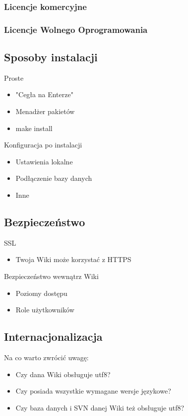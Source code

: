 \documentclass{article}
\begin{document}
	\subsubsection{Licencje komercyjne}
	\subsubsection{Licencje Wolnego Oprogramowania}
	\subsection{Sposoby instalacji}
		Proste
		\begin{itemize}
			\item "Cegła na Enterze"
			\item Menadżer pakietów
			\item make install
		\end{itemize}
		Konfiguracja po instalacji
		\begin{itemize}
			\item Ustawienia lokalne
			\item Podłączenie bazy danych
			\item Inne
		\end{itemize}
	\subsection{Bezpieczeństwo}
		SSL
		\begin{itemize}
			\item Twoja Wiki może korzystać z HTTPS
		\end{itemize}
		Bezpieczeństwo wewnątrz Wiki
		\begin{itemize}
			\item Poziomy dostępu
			\item Role użytkowników
		\end{itemize}
	\subsection{Internacjonalizacja}
		Na co warto zwrócić uwagę:
		\begin{itemize}
			\item Czy dana Wiki obsługuje utf8?
			\item Czy posiada wszystkie wymagane wersje językowe?
			\item Czy baza danych i SVN danej Wiki też obsługuje utf8?
		\end{itemize}
			
\end{document}
